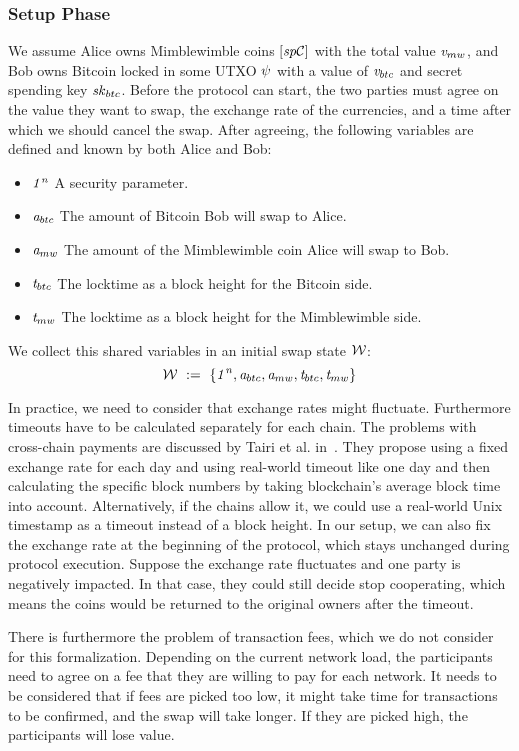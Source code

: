 \subsubsection{Setup Phase}\label{subsec:atom:setup}

We assume Alice owns Mimblewimble coins $[\mathit{sp}\mathcal{C}]$ with the total value $\mathit{v}_{mw}$, and Bob owns
Bitcoin locked in some UTXO $\psi$ with a value of $\mathit{v}_{btc}$ and secret spending key $\mathit{sk}_{btc}$.
Before the protocol can start, the two parties must agree on the value they want to swap, the exchange rate of the currencies, and a time after which we should cancel the swap.
After agreeing, the following variables are defined and known by both Alice and Bob:
\begin{itemize}
    \item $\mathit{1^n}$ A security parameter.
    \item $\mathit{a}_{btc}$ The amount of Bitcoin Bob will swap to Alice.
    \item $\mathit{a}_{mw}$ The amount of the Mimblewimble coin Alice will swap to Bob.
    \item $\mathit{t}_{btc}$ The locktime as a block height for the Bitcoin side.
    \item $\mathit{t}_{mw}$ The locktime as a block height for the Mimblewimble side.
\end{itemize}
We collect this shared variables in an initial swap state $\mathcal{W}$:
\[ \mathcal{W} ~:=~ \{ \mathit{1^n}, \mathit{a}_{btc}, \mathit{a}_{mw}, \mathit{t}_{btc}, \mathit{t}_{mw} \} \]

In practice, we need to consider that exchange rates might fluctuate.
Furthermore timeouts have to be calculated separately for each chain.
The problems with cross-chain payments are discussed by Tairi et al. in~\cite{tairi2019a2l}.
They propose using a fixed exchange rate for each day and using real-world timeout like one day and then calculating the specific block numbers by taking blockchain's average block time into account.
Alternatively, if the chains allow it, we could use a real-world Unix timestamp as a timeout instead of a block height.
In our setup, we can also fix the exchange rate at the beginning of the protocol, which stays unchanged during protocol execution.
Suppose the exchange rate fluctuates and one party is negatively impacted.
In that case, they could still decide stop cooperating, which means the coins would be returned to the original owners after the timeout.

There is furthermore the problem of transaction fees, which we do not consider for this formalization.
Depending on the current network load, the participants need to agree on a fee that they are willing to pay for each network.
It needs to be considered that if fees are picked too low, it might take time for transactions to be confirmed, and the swap will take longer.
If they are picked high, the participants will lose value.

